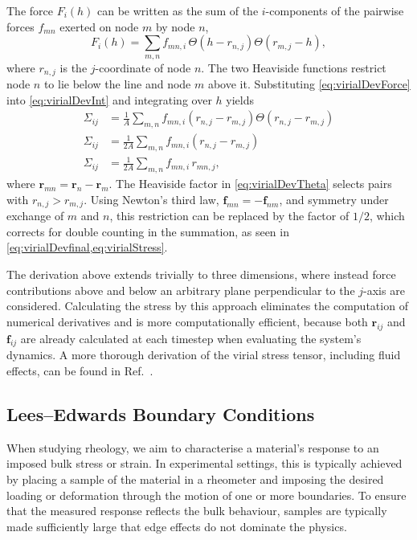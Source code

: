 The force $F_i(h)$ can be written as the sum of the $i$-components of the pairwise forces $f_{mn}$ exerted on node $m$ by node $n$,
\begin{equation}
    F_i(h) = \sum_{m,n} f_{mn,i}\,
    \Theta(h-r_{n,j})\Theta(r_{m,j}-h),
    \label{eq:virialDevForce}
\end{equation}
where $r_{n,j}$ is the $j$-coordinate of node $n$. The two Heaviside functions restrict node $n$ to lie below the line and node $m$ above it. Substituting \cref{eq:virialDevForce} into \cref{eq:virialDevInt} and integrating over $h$ yields
\begin{subequations}
\begin{align}
    \Sigma_{ij}
    &= \frac{1}{A}\sum_{m,n}
    f_{mn,i}(r_{n,j}-r_{m,j})
    \Theta(r_{n,j}-r_{m,j})
    \label{eq:virialDevTheta} \\
    \Sigma_{ij} &= \frac{1}{2A}\sum_{m,n}
    f_{mn,i}(r_{n,j}-r_{m,j})
    \label{eq:virialDevfinal} \\
    \Sigma_{ij} &= \frac{1}{2A}\sum_{m,n}
    f_{mn,i}\, r_{mn,j},
    \label{eq:virialStress}
\end{align}
\end{subequations}
where $\bm{r}_{mn}=\bm{r}_n-\bm{r}_m$. The Heaviside factor in \cref{eq:virialDevTheta} selects pairs with $r_{n,j}>r_{m,j}$. Using Newton's third law, $\bm{f}_{mn}=-\bm{f}_{nm}$, and symmetry under exchange of $m$ and $n$, this restriction can be replaced by the factor of $1/2$, which corrects for double counting in the summation, as seen in \cref{eq:virialDevfinal,eq:virialStress}.

The derivation above extends trivially to three dimensions, where instead force contributions above and below an arbitrary plane perpendicular to the $j$-axis are considered. Calculating the stress by this approach eliminates the computation of numerical derivatives and is more computationally efficient, because both $\bm{r}_{ij}$ and $\bm{f}_{ij}$ are already calculated at each timestep when evaluating the system's dynamics. A more thorough derivation of the virial stress tensor, including fluid effects, can be found in Ref.~\cite{yang_generalized_2012}.

\subsection{Lees--Edwards Boundary Conditions} \label{sec:Lees-Edwards}

When studying rheology, we aim to characterise a material's response to an imposed bulk stress or strain. In experimental settings, this is typically achieved by placing a sample of the material in a rheometer and imposing the desired loading or deformation through the motion of one or more boundaries. To ensure that the measured response reflects the bulk behaviour, samples are typically made sufficiently large that edge effects do not dominate the physics.

